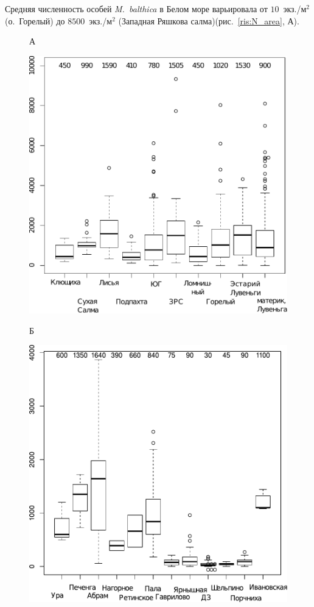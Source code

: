 {Средняя численность особей {\it M.~balthica} в Белом море варьировала от $10$~экз./м$^2$ (о.~Горелый) до $8500$~экз./м$^2$ (Западная Ряшкова салма)(рис.~\ref{ris:N_area}, А).
	\begin{figure}[ht]
	\begin{minipage}[]{.48\linewidth}
	{\small А}
	\begin{center}
		\includegraphics[width=\linewidth]{../All_N/N2_area_White1.pdf}
	\end{center}
	\end{minipage}
	\hfill
	\begin{minipage}[]{.48\linewidth}
	{\small Б}
	\begin{center}
		\includegraphics[width=\linewidth]{../All_N/N2_area_Barents1.pdf}

\end{center}
\end{minipage}
\end{figure}}
